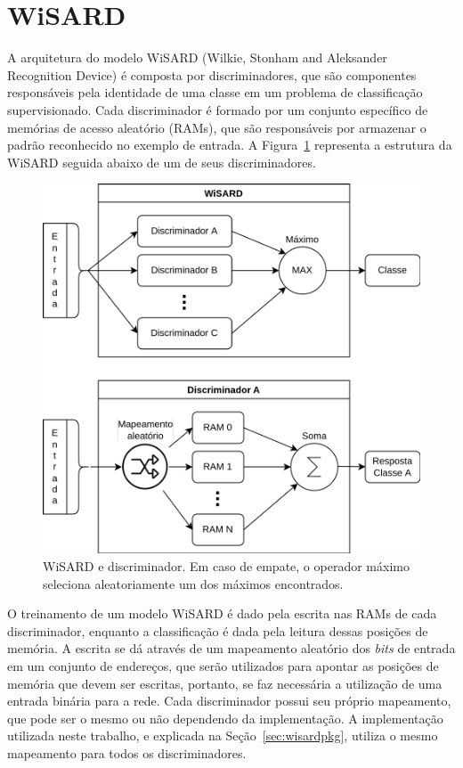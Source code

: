 \section{WiSARD}
A arquitetura do modelo WiSARD (Wilkie, Stonham and Aleksander Recognition Device) \cite{Aleksander1984WISARDaRS} é composta por discriminadores, que são componentes responsáveis pela identidade de uma classe em um problema de classificação supervisionado. Cada discriminador é formado por um conjunto específico de memórias de acesso aleatório (RAMs), que são responsáveis por armazenar o padrão reconhecido no exemplo de entrada. A Figura~\ref{fig:wsd_disc} representa a estrutura da WiSARD seguida abaixo de um de seus discriminadores.

\begin{figure}[!ht]
    \centering
    \includegraphics[width=5.0in]{img/wisard_discriminator.pdf}
    \caption{WiSARD e discriminador. Em caso de empate, o operador máximo seleciona aleatoriamente um dos máximos encontrados.}
    \label{fig:wsd_disc}
\end{figure}

O treinamento de um modelo WiSARD é dado pela escrita nas RAMs de cada discriminador, enquanto a classificação é dada pela leitura dessas posições de memória. A escrita se dá através de um mapeamento aleatório dos \textit{bits} de entrada em um conjunto de endereços, que serão utilizados para apontar as posições de memória que devem ser escritas, portanto, se faz necessária a utilização de uma entrada binária para a rede. Cada discriminador possui seu próprio mapeamento, que pode ser o mesmo ou não dependendo da implementação. A implementação utilizada neste trabalho, e explicada na Seção~\ref{sec:wisardpkg}, utiliza o mesmo mapeamento para todos os discriminadores.

